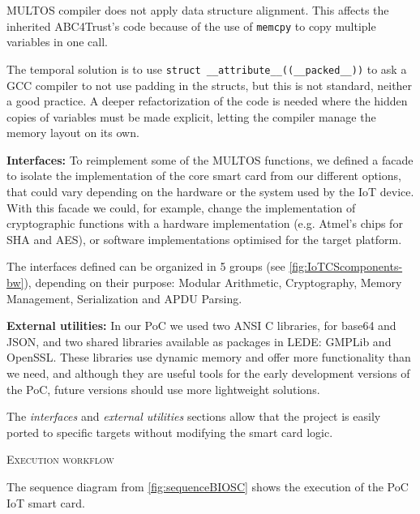 MULTOS compiler does not apply data structure alignment. This affects the inherited ABC4Trust's code because of the use of \texttt{memcpy} to copy multiple variables in one call.%

The temporal solution is to use \texttt{struct \_\_attribute\_\_((\_\_packed\_\_))} to ask a GCC compiler to not use padding in the structs, but this is not standard, neither a good practice. A deeper refactorization of the code is needed where the hidden copies of variables must be made explicit, letting the compiler manage the memory layout on its own.

\hfil

\textbf{Interfaces:} To reimplement some of the MULTOS functions, we defined a facade to isolate the implementation of the core smart card from our different options, that could vary depending on the hardware or the system used by the IoT device.
With this facade we could, for example, change the implementation of cryptographic functions with a hardware implementation (e.g. Atmel's chips for SHA and AES), or software implementations optimised for the target platform.

The interfaces defined can be organized in 5 groups (see \autoref{fig:IoTCScomponents-bw}), depending on their purpose: Modular Arithmetic, Cryptography, Memory Management, Serialization and APDU Parsing.

\hfil

\textbf{External utilities:} In our PoC we used two ANSI C libraries, for base64 and JSON, and two shared libraries available as packages in LEDE: GMPLib and OpenSSL. These libraries use dynamic memory and offer more functionality than we need, and although they are useful tools for the early development versions of the PoC, future versions should use more lightweight solutions.

\hfil

The \textit{interfaces} and \textit{external utilities} sections  allow that the project is easily ported to specific targets without modifying the smart card logic.


\hfil

\textsc{Execution workflow}

The sequence diagram from \autoref{fig:sequenceBIOSC} shows the execution of the PoC IoT smart card.



